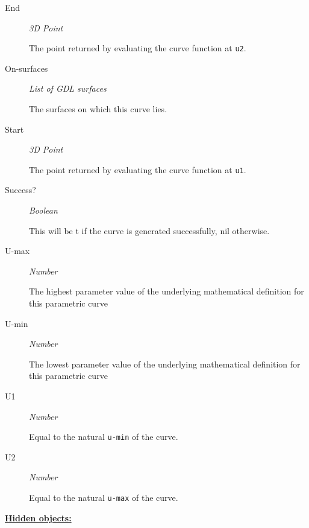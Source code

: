 \documentclass [11pt]{book}
\begin{document}
\begin{itemize}
\begin{description}
\item [End]
\emph{3D Point}

 The point returned by evaluating the curve function at \texttt{u2}.




\item [On-surfaces]
\emph{List of GDL surfaces}

 The surfaces on which this curve lies.




\item [Start]
\emph{3D Point}

 The point returned by evaluating the curve function at \texttt{u1}.




\item [Success?]
\emph{Boolean}

 This will be t if the curve is generated successfully, nil otherwise.




\item [U-max]
\emph{Number}

 The highest parameter value of the underlying mathematical definition for this parametric curve




\item [U-min]
\emph{Number}

 The lowest parameter value of the underlying mathematical definition for this parametric curve




\item [U1]
\emph{Number}

 Equal to the natural \texttt{u-min} of the curve.




\item [U2]
\emph{Number}

 Equal to the natural \texttt{u-max} of the curve.




\end{description}






\textbf{
\underline{Hidden objects:}}

\begin{description}


\end{description}
\end{itemize}
\end{document}
